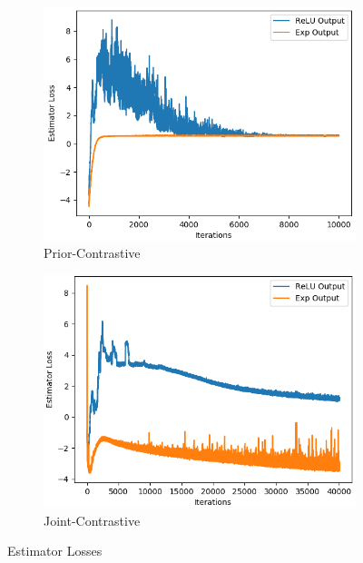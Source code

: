\documentclass[honours,12pt]{unswthesis}
\numberwithin{equation}{section}
\theoremstyle{definition}
\begin{document}
\begin{figure}[h!]
\begin{subfigure}{0.49\textwidth}
\includegraphics[width=\linewidth]{estimator_losses/PCKLvsPCKLEXP.png}
\caption{Prior-Contrastive}
\end{subfigure}
\begin{subfigure}{0.49\textwidth}
\includegraphics[width=\linewidth]{estimator_losses/JCKLvsJCKLEXP.png}
\caption{Joint-Contrastive}
\end{subfigure}
\caption{Estimator Losses}
\end{figure}
\end{document}
